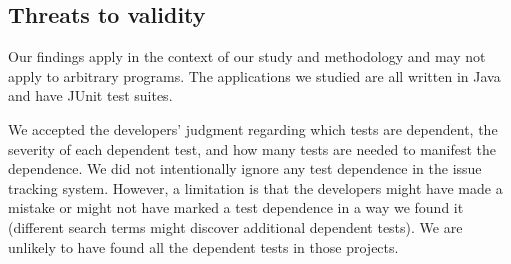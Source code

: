 \subsection{Threats to validity}

Our findings apply in the context of our study and methodology and may not
apply to arbitrary programs.
The applications we studied are all written in 
Java and have JUnit test suites.  

We accepted the developers' judgment regarding which tests are dependent,
the severity of each dependent test, and how many tests are needed
to manifest the dependence.  We did not intentionally ignore
any test dependence in the issue tracking system.
However, a limitation is that the developers might have made a mistake or
might not have marked a test dependence in a way we found it
(different search terms might discover additional dependent tests).  We are
unlikely to have found all the dependent tests in those projects. 


